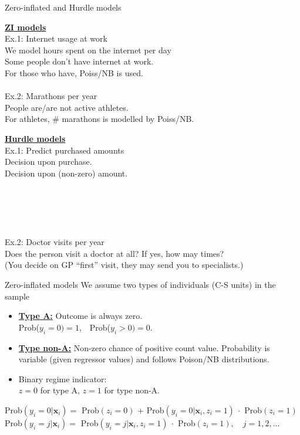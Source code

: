 \documentclass[usenames,dvipsnames]{beamer}
\begin{document}
\begin{frame}{Zero-inflated and Hurdle models}
\begin{minipage}[t]{.49\textwidth}
\underline{\textbf{ZI models}} \\

\small{Ex.1: Internet usage at work\\
We model hours spent on the internet per day\\
Some people don't have internet at work.\\
For those who have, Poiss/NB is used.\\
~\\
Ex.2: Marathons per year\\
People are/are not active athletes.\\
For athletes, \# marathons is modelled by Poiss/NB.}
\end{minipage}%
\hspace*{7mm}
\begin{minipage}[t]{.49\textwidth}
\underline{\textbf{Hurdle models}} \\

\small{Ex.1: Predict purchased amounts \\
Decision upon purchase.\\
Decision upon (non-zero) amount.\\
~\\
~\\
~\\
~\\
~\\
Ex.2: Doctor visits per year\\
Does the person visit a doctor at all? 
If yes, how may times?\\(You decide on GP ``first'' visit, they may send you to specialists.)}
\end{minipage}
\end{frame}
\begin{frame}{Zero-inflated models}
We assume two types of individuals (C-S units) in the sample\\
\begin{itemize}
\item[] \underline{\textbf{Type A:}} Outcome is always zero.\\
Prob($y_i=0) =1$,~~Prob($y_i>0) =0$.\\
\smallskip
\item[] \underline{\textbf{Type non-A:}} Non-zero chance of positive count value. Probability is variable (given regressor values) and follows Poison/NB distributions.
\smallskip
\item[] Binary regime indicator: \\
$z=0$ for type A, $z=1$ for type non-A.
\end{itemize}
\medskip
\small{Prob$(y_i=0|\bm{x}_i) = $ Prob$(z_i\!=\!0)$ +  Prob$(y_i=0|\bm{x}_i, z_i\!=\!1)~\cdot$ Prob$(z_i\!=\!1)$}\\
\small{Prob$(y_i=j|\bm{x}_i) =$ Prob$(y_i=j|\bm{x}_i, z_i\!=\!1)~\cdot$ Prob$(z_i\!=\!1),\quad j=1,2,\dots$}
\end{frame}
\end{document}
